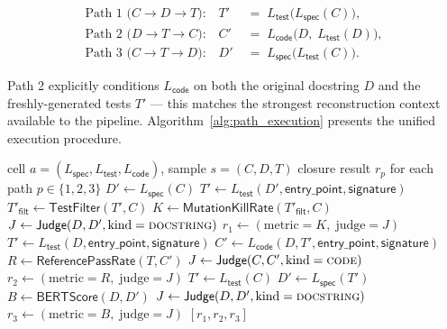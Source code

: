 \begin{align}
  \text{Path 1 (}C \to D \to T\text{):} \quad
  T' &\;=\; L_{\textsf{test}}\bigl(L_{\textsf{spec}}(C)\bigr), \label{eq:path1}\\
  \text{Path 2 (}D \to T \to C\text{):} \quad
  C' &\;=\; L_{\textsf{code}}\bigl(D,\; L_{\textsf{test}}(D)\bigr), \label{eq:path2}\\
  \text{Path 3 (}C \to T \to D\text{):} \quad
  D' &\;=\; L_{\textsf{spec}}\bigl(L_{\textsf{test}}(C)\bigr). \label{eq:path3}
\end{align}

Path 2 explicitly conditions $L_{\textsf{code}}$ on both the original docstring $D$ and the freshly-generated tests $T'$ --- this matches the strongest reconstruction context available to the pipeline. Algorithm~\ref{alg:path_execution} presents the unified execution procedure.

\begin{algorithm}[h]
\caption{Round-trip closure path execution}
\label{alg:path_execution}
\begin{algorithmic}[1]
\Require cell $a = (L_{\textsf{spec}}, L_{\textsf{test}}, L_{\textsf{code}})$, sample $s = (C, D, T)$
\Ensure closure result $r_p$ for each path $p \in \{1, 2, 3\}$
   
    \State $D' \leftarrow L_{\textsf{spec}}(C)$
    \State $T' \leftarrow L_{\textsf{test}}(D', \textsf{entry\_point}, \textsf{signature})$
    \State $T'_{\textsf{filt}} \leftarrow \textsf{TestFilter}(T', C)$ 
    \State $K \leftarrow \textsf{MutationKillRate}(T'_{\textsf{filt}}, C)$
    \State $J \leftarrow \textsf{Judge}(D, D', \text{kind}=\textsc{docstring})$
    \State $r_1 \leftarrow (\text{metric}=K,\; \text{judge}=J)$
   
    \State $T' \leftarrow L_{\textsf{test}}(D, \textsf{entry\_point}, \textsf{signature})$
    \State $C' \leftarrow L_{\textsf{code}}(D, T', \textsf{entry\_point}, \textsf{signature})$
    \State $R \leftarrow \textsf{ReferencePassRate}(T, C')$
    \State $J \leftarrow \textsf{Judge}(C, C', \text{kind}=\textsc{code})$
    \State $r_2 \leftarrow (\text{metric}=R,\; \text{judge}=J)$
  \Else {}
    \State $T' \leftarrow L_{\textsf{test}}(C)$
    \State $D' \leftarrow L_{\textsf{spec}}(T')$
    \State $B \leftarrow \textsf{BERTScore}(D, D')$
    \State $J \leftarrow \textsf{Judge}(D, D', \text{kind}=\textsc{docstring})$
    \State $r_3 \leftarrow (\text{metric}=B,\; \text{judge}=J)$
  \EndIf
\EndFor
\State \Return $[r_1, r_2, r_3]$
\end{algorithmic}
\end{algorithm}

